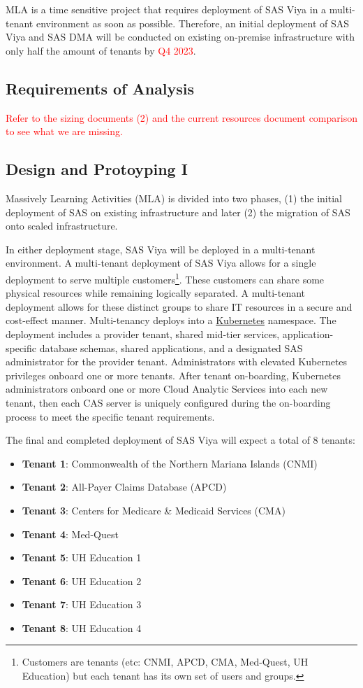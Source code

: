 MLA is a time sensitive project that requires deployment of SAS Viya in a multi-tenant environment as soon as possible. Therefore, an initial deployment of SAS Viya and SAS DMA will be conducted on existing on-premise infrastructure with only half the amount of tenants by \textcolor{red}{Q4 2023}. 

\subsection{Requirements of Analysis}
\textcolor{red}{Refer to the sizing documents (2) and the current resources document comparison to see what we are missing.}

\subsection{Design and Protoyping I}
Massively Learning Activities (MLA) is divided into two phases, (1) the initial deployment of SAS on existing infrastructure and later (2) the migration of SAS onto scaled infrastructure. 

In either deployment stage, SAS Viya will be deployed in a multi-tenant environment. A multi-tenant deployment of SAS Viya allows for a single deployment to serve multiple customers\footnote{Customers are tenants (etc: CNMI, APCD, CMA, Med-Quest, UH Education) but each tenant has its own set of users and groups.}. These customers can share some physical resources while remaining logically separated. A multi-tenant deployment allows for these distinct groups to share IT resources in a secure and cost-effect manner. Multi-tenancy deploys into a \href{https://kubernetes.io/}{Kubernetes} namespace. The deployment includes a provider tenant, shared mid-tier services, application-specific database schemas, shared applications, and a designated SAS administrator for the provider tenant. Administrators with elevated Kubernetes privileges onboard one or more tenants. After tenant on-boarding, Kubernetes administrators onboard one or more Cloud Analytic Services into each new tenant, then each CAS server is uniquely configured during the on-boarding process to meet the specific tenant requirements. 

The final and completed deployment of SAS Viya will expect a total of 8 tenants:

\begin{itemize}
    \item \textbf{Tenant 1}: Commonwealth of the Northern Mariana Islands (CNMI)
    \item \textbf{Tenant 2}: All-Payer Claims Database (APCD)
    \item \textbf{Tenant 3}: Centers for Medicare \& Medicaid Services (CMA)
    \item \textbf{Tenant 4}: Med-Quest
    \item \textbf{Tenant 5}: UH Education 1
    \item \textbf{Tenant 6}: UH Education 2
    \item \textbf{Tenant 7}: UH Education 3
    \item \textbf{Tenant 8}: UH Education 4
\end{itemize}

